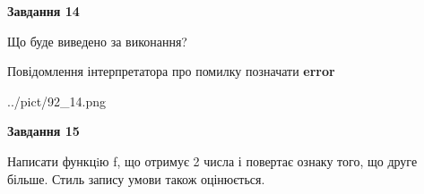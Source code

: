 \documentclass[11pt, ukrainian]{article}
\begin{document}
{\begin {large}
{\begin {center}\textbf{Завдання 14}\end {center}}\par
Що буде виведено за виконання? \par
Повідомлення інтерпретатора про помилку позначати \textbf{error}

\begin{center}
	{../pict/92_14.png}
\end{center}
\newpage

{\begin {center}\textbf{Завдання 15}\end {center}}\par

Написати функцiю f, що отримує 2 числа і повертає ознаку того, що друге більше. Стиль запису умови також оцінюється.\par
\newpage

\end {large}}
\end{document}
